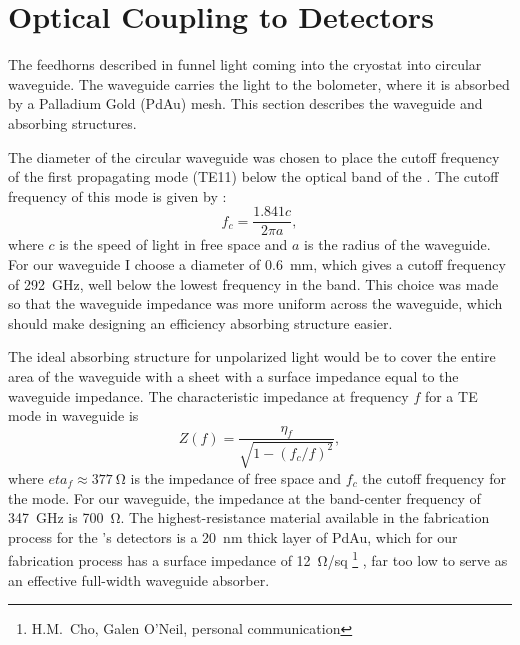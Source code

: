 \section{Optical Coupling to Detectors} \label{sec:ch4-coupling}

The feedhorns described in  funnel light coming into the cryostat into circular waveguide.
The waveguide carries the light to the bolometer, where it is absorbed by a Palladium Gold (PdAu) mesh.
This section describes the waveguide and absorbing structures.

The diameter of the circular waveguide was chosen to place the cutoff frequency of the first propagating mode (TE11) below the optical band of the \Imager.
The cutoff frequency of this mode is given by \cite[Chapter~5]{harrington_time-harmonic_2001}:
\begin{equation} \label{eqn:ch4-te11-cutoff}
  f_c = \frac{1.841 c}{2 \pi a },
\end{equation}
where $c$ is the speed of light in free space and $a$ is the radius of the waveguide.
For our waveguide I choose a diameter of \SI{0.6}{\mm}, which gives a cutoff frequency of \SI{292}{\GHz}, well below the lowest frequency in the band.
This choice was made so that the waveguide impedance was more uniform across the waveguide, which should make designing an efficiency absorbing structure easier.

The ideal absorbing structure for unpolarized light would be to cover the entire area of the waveguide with a sheet with a surface impedance equal to the waveguide impedance.
The characteristic impedance at frequency $f$ for a TE mode in waveguide is \cite[Chapter~2]{harrington_time-harmonic_2001}
\begin{equation} \label{eqn:ch4-wg-imp}
  Z (f) = \frac{\eta_f}{\sqrt{1 - (f_c/f)^2}},
\end{equation}
where $eta_f \approx \SI{377}{\ohm}$ is the impedance of free space and $f_c$ the cutoff frequency for the mode.
For our waveguide, the impedance at the band-center frequency of \SI{347}{\GHz} is \SI{700}{\ohm}.
The highest-resistance material available in the fabrication process for the \Imager's detectors is a \SI{20}{\nm} thick layer of PdAu, which for our fabrication process has a surface impedance of \SI{12}{\ohm}/sq%
\footnote{H.M.~Cho, Galen O'Neil, personal communication}%
, far too low to serve as an effective full-width waveguide absorber.

